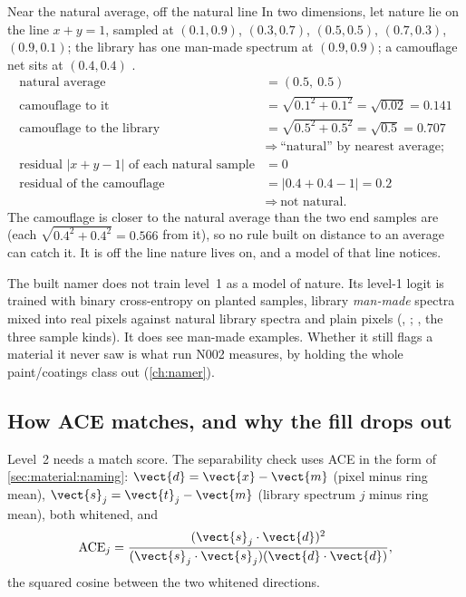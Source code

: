 \begin{worked}[label={we:material:openset}]{Near the natural average, off the natural line}
In two dimensions, let nature lie on the line $x+y=1$, sampled at $(0.1,0.9)$, $(0.3,0.7)$, $(0.5,0.5)$, $(0.7,0.3)$,
$(0.9,0.1)$; the library has one man-made spectrum at $(0.9,0.9)$; a camouflage net sits at $(0.4,0.4)$ \tagA.
\begin{align*}
\text{natural average} &= (0.5,\ 0.5)\\
\text{camouflage to it} &= \sqrt{0.1^2+0.1^2}=\sqrt{0.02}=0.141\\
\text{camouflage to the library} &= \sqrt{0.5^2+0.5^2}=\sqrt{0.5}=0.707\\
&\Rightarrow\ \text{``natural'' by nearest average;}\\
\text{residual } |x+y-1| \text{ of each natural sample} &= 0\\
\text{residual of the camouflage} &= |0.4+0.4-1|=0.2\\
&\Rightarrow\ \text{not natural.}
\end{align*}
The camouflage is closer to the natural average than the two end samples are (each $\sqrt{0.4^2+0.4^2}=0.566$ from
it), so no rule built on distance to an average can catch it. It is off the line nature lives on, and a model of that
line notices.
\end{worked}

\begin{sourcenote}
The built namer does not train level~1 as a model of nature. Its level-1 logit is trained with binary cross-entropy
on planted samples, library \emph{man-made} spectra mixed into real pixels against natural library spectra and plain
pixels (, ; , the three sample kinds). It
does see man-made examples. Whether it still flags a material it never saw is what run N002 measures, by holding the
whole paint/coatings class out (\cref{ch:namer}).
\end{sourcenote}

\subsection{How ACE matches, and why the fill drops out}

Level~2 needs a match score. The separability check uses ACE in the form of \cref{sec:material:naming}:
$\vect{d}=\vect{x}-\vect{m}$ (pixel minus ring mean), $\vect{s}_j=\vect{t}_j-\vect{m}$ (library spectrum $j$ minus ring
mean), both whitened, and
\begin{equation}
\text{ACE}_j=\frac{(\vect{s}_j\cdot\vect{d})^2}{(\vect{s}_j\cdot\vect{s}_j)(\vect{d}\cdot\vect{d})},
\end{equation}
the squared cosine between the two whitened directions.

